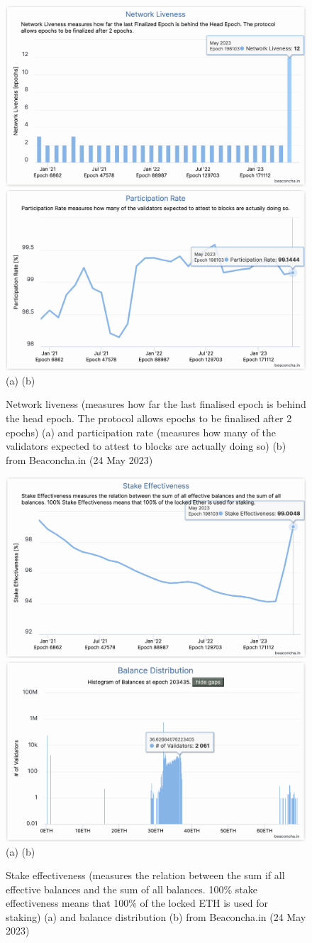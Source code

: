 \documentclass[UTF8]{article}
\begin{document}
\begin{figure}[htbp]
\begin{center}
\includegraphics[width=0.48\linewidth]{images/bchart5}
\includegraphics[width=0.48\linewidth]{images/bchart6} \\
(a)\hspace{160pt}        (b)\\
\caption{Network liveness (measures how far the last finalised epoch is behind the head epoch. The protocol allows epochs to be finalised after 2 epochs) (a) and participation rate (measures how many of the validators expected to attest to blocks are actually doing so) (b) from Beaconcha.in (24 May 2023)}
\label{fig:chart5}
\end{center}
\end{figure}

\begin{figure}[htbp]
\begin{center}
\includegraphics[width=0.48\linewidth]{images/bchart7}
\includegraphics[width=0.48\linewidth]{images/bchart8} \\
(a)\hspace{160pt}        (b)\\
\caption{Stake effectiveness (measures the relation between the sum if all effective balances and the sum of all balances. 100\% stake effectiveness means that 100\% of the locked ETH is used for staking) (a) and balance distribution (b) from Beaconcha.in (24 May 2023)}
\label{fig:chart7}
\end{center}
\end{figure}
\end{document}
